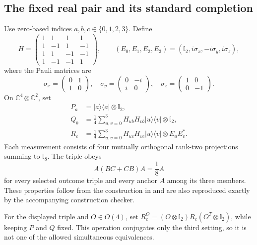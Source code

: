 \documentclass[11pt]{article}
\newcommand{\id}{\mathbb I}
\begin{document}
\subsection{The fixed real pair and its standard completion}\label{app:explicit}
Use zero-based indices $a,b,c\in\{0,1,2,3\}$. Define
\[
H=\begin{pmatrix}1&1&1&1\\1&-1&1&-1\\
1&1&-1&-1\\1&-1&-1&1\end{pmatrix},\qquad
(E_0,E_1,E_2,E_3)=(\id_2,i\sigma_x,-i\sigma_y,i\sigma_z),
\]
where the Pauli matrices are
\[
\sigma_x=\begin{pmatrix}0&1\\1&0\end{pmatrix},\quad
\sigma_y=\begin{pmatrix}0&-i\\i&0\end{pmatrix},\quad
\sigma_z=\begin{pmatrix}1&0\\0&-1\end{pmatrix}.
\]
On $\mathbb C^4\otimes\mathbb C^2$, set
\begin{align*}
P_a&=|a\rangle\langle a|\otimes\id_2,\\
Q_b&=\frac14\sum_{u,v=0}^3 H_{ub}H_{vb}|u\rangle\langle v|\otimes\id_2,\\
R_c&=\frac14\sum_{u,v=0}^3 H_{uc}H_{vc}|u\rangle\langle v|\otimes E_uE_v^*.
\end{align*}
Each measurement consists of four mutually orthogonal rank-two projections
summing to $\id_8$. The triple obeys
\begin{equation}\label{eq:explicittriple}
 A(BC+CB)A=\frac18 A
\end{equation}
for every selected outcome triple and every anchor $A$ among its three
members. These properties follow from the construction in \cite{DF} and
are also reproduced exactly by the accompanying construction checker.


For the displayed triple and
$O\in O(4)$, set $R_c^O=(O\otimes\id_2)R_c(O^T\otimes\id_2)$,
while keeping $P$ and $Q$ fixed. This operation conjugates only the
third setting, so it is not one of the allowed simultaneous equivalences.
\end{document}

